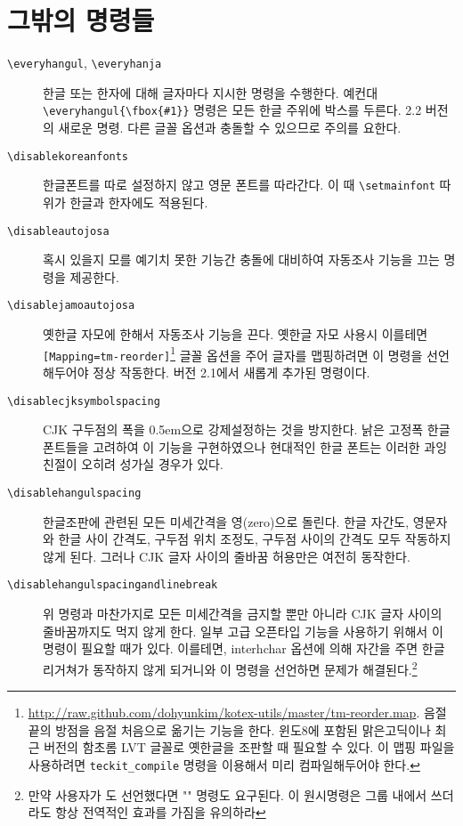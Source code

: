 \documentclass[a4paper]{article}
\def\logoko{\textsf{k}\kern-.2ex\textit{o}}
\def\XeTeX{\hologo{XeTeX}}
\def\xetexko{\XeTeX\kern-.1ex -\logoko}
\def\cs#1{\texttt{\textbackslash #1}}
\begin{document}
\section{그밖의 명령들}
\begin{description}
  \item[\cs{everyhangul}, \cs{everyhanja}]
    한글 또는 한자에 대해 글자마다 지시한 명령을 수행한다. 예컨대
    \verb|\everyhangul{\fbox{#1}}| 명령은 모든
    {\fboxsep=1pt 한글 주위에 박스}를
    두른다.  2.2 버전의 새로운 명령. 다른 글꼴 옵션과 충돌할 수 있으므로
    주의를 요한다.

  \item[\cs{disablekoreanfonts}]
한글폰트를 따로 설정하지 않고 영문 폰트를 따라간다.
이 때  \verb|\setmainfont| 따위가 한글과 한자에도 적용된다.

  \item[\cs{disableautojosa}]
혹시 있을지 모를 예기치 못한 기능간 충돌에 대비하여 자동조사 기능을
끄는 명령을 제공한다.

  \item[\cs{disablejamoautojosa}]
옛한글 자모에 한해서 자동조사 기능을 끈다.
옛한글 자모 사용시 이를테면 \verb|[Mapping=tm-reorder]|\footnote{%
  \url{http://raw.github.com/dohyunkim/kotex-utils/master/tm-reorder.map}.
  음절 끝의 방점을 음절 처음으로 옮기는 기능을 한다.  윈도8에 포함된
  맑은고딕이나 최근 버전의 함초롬 LVT 글꼴로 옛한글을 조판할 때 필요할 수
  있다. 이 맵핑 파일을 사용하려면 \texttt{teckit\_compile} 명령을 이용해서
  미리 컴파일해두어야 한다.}
글꼴 옵션을 주어 글자를 맵핑하려면 이 명령을 선언해두어야 정상 작동한다.
버전 2.1에서 새롭게 추가된 명령이다.

  \item[\cs{disablecjksymbolspacing}]
CJK 구두점의 폭을 0.5em으로 강제설정하는 것을 방지한다.
 낡은 고정폭 한글 폰트들을 고려하여 이 기능을 구현하였으나
현대적인 한글 폰트는 이러한 과잉친절이 오히려 성가실 경우가 있다.

  \item[\cs{disablehangulspacing}]
한글조판에 관련된 모든 미세간격을 영(zero)으로 돌린다. 한글 자간도,
영문자와 한글 사이 간격도, 구두점 위치 조정도, 구두점 사이의 간격도
모두 작동하지 않게 된다. 그러나 CJK 글자 사이의 줄바꿈 허용만은 여전히
동작한다.

  \item[\cs{disablehangulspacingandlinebreak}]
위 명령과 마찬가지로 모든 미세간격을 금지할 뿐만 아니라 CJK 글자 사이의
줄바꿈까지도 먹지 않게 한다.
일부 고급 오픈타입 기능을 사용하기 위해서 이 명령이 필요할 때가 있다.
이를테면, interhchar 옵션에 의해 자간을 주면 한글 리거쳐가
동작하지 않게 되거니와 이 명령을 선언하면 문제가
해결된다.\footnote{만약 사용자가
  {\ttfamily\string\XeTeXlinebreaklocale}도 선언했다면
  {\ttfamily\string\XeTeXlinebreaklocale""} 명령도 요구된다.
  이 원시명령은 그룹 내에서 쓰더라도 항상 전역적인 효과를 가짐을 유의하라}
\end{description}
\end{document}
